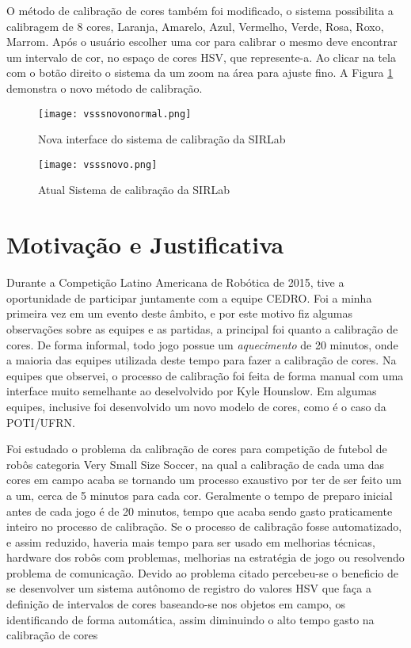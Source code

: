 O método de calibração de cores também foi modificado, o sistema possibilita a calibragem de 8 cores, Laranja, Amarelo, Azul, Vermelho, Verde, Rosa, Roxo, Marrom\cite{VSSVision}. Após o usuário escolher uma cor para calibrar o mesmo deve encontrar um intervalo de cor, no espaço de cores HSV, que represente-a. Ao clicar na tela com o botão direito o sistema da um zoom na área para ajuste fino. A Figura \ref{SIRLabNovaCalibracao} demonstra o novo método de calibração.
\begin{figure}[H]
\begin{minipage}[H]{0.45\linewidth}
\hspace{0.5cm}
\centering
\texttt{[image: vsssnovonormal.png]}
\caption{Nova interface do sistema de calibração da SIRLab\cite{VSSVision}}
\label{SIRLabNova}
\end{minipage}
\hspace{0.5cm}
\begin{minipage}[H]{0.40\linewidth}
\centering
\texttt{[image: vsssnovo.png]}
\caption{Atual Sistema de calibração da SIRLab\cite{VSSVision}}
\label{SIRLabNovaCalibracao}
\end{minipage}
\end{figure}	

\section{Motivação e Justificativa}
Durante a Competição Latino Americana de Robótica de 2015, tive a oportunidade de participar juntamente com a equipe CEDRO. Foi a minha primeira vez em um evento deste âmbito, e por este motivo fiz algumas observações sobre as equipes e as partidas, a principal foi quanto a calibração de cores. De forma informal, todo jogo possue um \emph{aquecimento} de 20 minutos, onde a maioria das equipes utilizada deste tempo para fazer a calibração de cores. Na equipes que observei, o processo de calibração foi feita de forma manual com uma interface muito semelhante ao deselvolvido por Kyle Hounslow\cite{YouTube}. Em algumas equipes, inclusive foi desenvolvido um novo modelo de cores, como é o caso da POTI/UFRN\cite{Martins:2007}.

Foi estudado o problema da calibração de cores para competição de futebol de robôs categoria Very Small Size Soccer, na qual a calibração de cada uma das cores em campo acaba se tornando um processo exaustivo por ter de ser feito um a um, cerca de 5 minutos para cada cor. Geralmente o tempo de preparo inicial antes de cada jogo é de 20 minutos, tempo que acaba sendo gasto praticamente inteiro no processo de calibração. Se o processo de calibração fosse automatizado, e assim reduzido, haveria mais tempo para ser usado em melhorias técnicas, hardware dos robôs com problemas, melhorias na estratégia de jogo ou resolvendo problema de comunicação. Devido ao problema citado percebeu-se o beneficio de se desenvolver um sistema autônomo de registro do valores HSV que faça a definição de intervalos de cores baseando-se nos objetos em campo, os identificando de forma automática, assim diminuindo o alto tempo gasto na calibração de cores 
